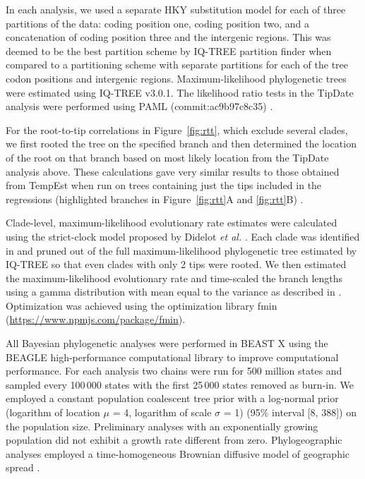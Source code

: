\documentclass[11pt,a4paper]{article}
\begin{document}
In each analysis, we used a separate HKY substitution model \cite{Hasegawa1985-ei} for each of three partitions of the data: coding position one, coding position two, and a concatenation of coding position three and the intergenic regions.
This was deemed to be the best partition scheme by IQ-TREE partition finder when compared to a partitioning scheme with separate partitions for each of the tree codon positions and intergenic regions.
Maximum-likelihood phylogenetic trees were estimated using IQ-TREE v3.0.1\cite{Minh2020-uy}. 
The likelihood ratio tests in the TipDate analysis \cite{Rambaut2000-ss} were performed using PAML (commit:ac9b97c8c35) \cite{Yang2007-gc,Yang1997-pd}.

For the root-to-tip correlations in Figure~\ref{fig:rtt}, which exclude several clades, we first rooted the tree on the specified branch and then determined the location of the root on that branch based on most likely location from the TipDate analysis above.
These calculations gave very similar results to those obtained from TempEst when run on trees containing just the tips included in the regressions (highlighted branches in Figure~\ref{fig:rtt}A and \ref{fig:rtt}B) \cite{Rambaut2016-gr}.

Clade-level, maximum-likelihood evolutionary rate estimates were calculated using the strict-clock model proposed by Didelot \textit{et al.} \cite{Didelot2018-st}.
Each clade was identified in and pruned out of the full maximum-likelihood phylogenetic tree estimated by IQ-TREE so that even clades with only 2 tips were rooted.
We then estimated the maximum-likelihood evolutionary rate and time-scaled the branch lengths using a gamma distribution with mean equal to the variance as described in \cite{Didelot2018-st}. 
Optimization was achieved using the optimization library fmin (\url{https://www.npmjs.com/package/fmin}).

All Bayesian phylogenetic analyses were performed in BEAST X \cite{BEASTX} using the BEAGLE high-performance computational library \cite{ayres2019beagle} to improve computational performance. 
For each analysis two chains were run for 500 million states and sampled every 100\,000 states with the first 25\,000 states removed as burn-in.
We employed a constant population coalescent tree prior with a log-normal prior (logarithm of location $\mu$ = 4, logarithm of scale $\sigma$ = 1) (95\% interval [8, 388]) on the population size.
Preliminary analyses with an exponentially growing population did not exhibit a growth rate different from zero.
Phylogeographic analyses employed a time-homogeneous Brownian diffusive model of geographic spread \cite{Lemey2010-ru}. 
\end{document}
